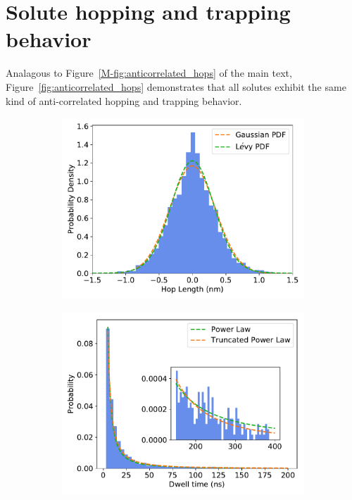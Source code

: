 \documentclass{article}
\begin{document}
  \newpage
  
  \section{Solute hopping and trapping behavior}\label{section:sfbm_other_solutes}
  
  Analagous to Figure~\ref{M-fig:anticorrelated_hops} of the main text,
  Figure~\ref{fig:anticorrelated_hops} demonstrates that all solutes exhibit the
  same kind of anti-correlated hopping and trapping behavior.
  
  \begin{figure}[h]
  \centering
  \begin{subfigure}{0.3\textwidth}
  \includegraphics[width=\textwidth]{gaussian_levy_comparison_anomalous_GCL.pdf}
  \caption{}\label{fig:GCL_hop_distribution_comparison}
  \end{subfigure}
  \begin{subfigure}{0.3\textwidth}
  \includegraphics[width=\textwidth]{GCL_powerlaw.pdf}

\end{subfigure}
\end{figure}
\end{document}
